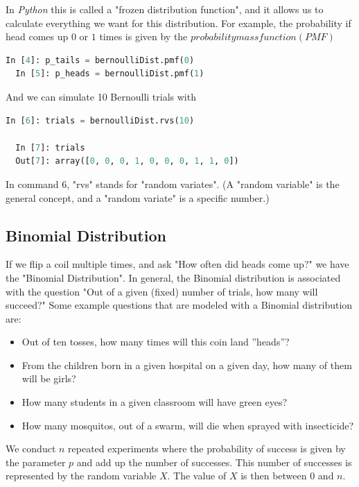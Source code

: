In \emph{Python} this is called a "frozen distribution function", and it allows us to calculate everything we want for this distribution. For example, the probability if head comes up $0$ or $1$ times is given by the $probability mass function (PMF)$

\begin{lstlisting}[language=Python]
  In [4]: p_tails = bernoulliDist.pmf(0)
  In [5]: p_heads = bernoulliDist.pmf(1)
\end{lstlisting}

And we can simulate 10 Bernoulli trials with

\begin{lstlisting}[language=Python]
  In [6]: trials = bernoulliDist.rvs(10)

  In [7]: trials
  Out[7]: array([0, 0, 0, 1, 0, 0, 0, 1, 1, 0])
\end{lstlisting}

In command $6$, "rvs" stands for "random variates". (A "random variable" is the general concept, and a "random variate" is a specific number.)

\subsection{Binomial Distribution}\label{sec:binomialDist}

If we flip a coil multiple times, and ask "How often did heads come up?" we have the "Binomial Distribution". In general, the Binomial distribution is associated with the question "Out of a given (fixed) number of trials, how many will succeed?" Some example questions that are modeled with a Binomial distribution are:
\begin{itemize}
  \item Out of ten tosses, how many times will this coin land ''heads''?
  \item From the children born in a given hospital on a given day, how many of them will be girls?
  \item How many students in a given classroom will have green eyes?
  \item How many mosquitos, out of a swarm, will die when sprayed with insecticide?
\end{itemize}

We conduct $n$ repeated experiments where the probability of success is given by the parameter $p$ and add up the number of successes. This number of successes is represented by the random variable $X$.  The value of $X$ is then between 0 and $n$.

